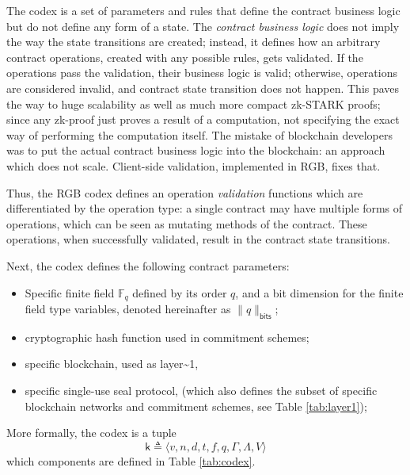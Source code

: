 \documentclass[9pt,oneside]{amsart}
\begin{document}
\begin{multicols}{2}
The codex is a set of parameters and rules that define the contract business logic
but do not define any form of a state. The \emph{contract business logic} does not imply
the way the state transitions are created; instead, it defines how an arbitrary
contract operations, created with any possible rules, gets validated.
If the operations pass the validation, their business logic is valid;
otherwise, operations are considered invalid, and contract state transition does not happen.
This paves the way to huge scalability as well as much more compact zk-STARK proofs;
since any zk-proof just proves a result of a computation,
not specifying the exact way of performing the computation itself.
The mistake of blockchain developers was to put the actual contract business logic into
the blockchain: an approach which does not scale.
Client-side validation, implemented in RGB, fixes that.

Thus, the RGB codex defines an operation \emph{validation} functions
which are differentiated by the operation type:
a single contract may have multiple forms of operations,
which can be seen as mutating methods of the contract.
These operations, when successfully validated,
result in the contract state transitions.

Next, the codex defines the following contract parameters:

\begin{itemize}
\item Specific finite field $\mathbb{F}_q$ defined by its order $q$,
  and a bit dimension for the finite field type variables, denoted hereinafter as $\|q\|_\mathsf{bits}$;
\item cryptographic hash function used in commitment schemes;
\item specific blockchain, used as \gls{layer~1},
\item specific single-use seal protocol,
  (which also defines the subset of specific blockchain networks
  and commitment schemes, see Table \ref{tab:layer1});
\end{itemize}

More formally, the codex is a tuple
\noindent
\begin{equation}
\mathsf{k} \triangleq \langle v, n, d, t, f, q, \mathsf{\Gamma}, \mathsf{\Lambda}, V \rangle
\end{equation}
\noindent
which components are defined in Table \ref{tab:codex}.


\end{multicols}
\end{document}
